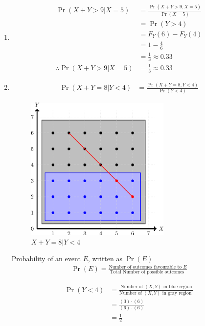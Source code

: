 \documentclass[journal,12pt,twocolumn]{IEEEtran}
\providecommand{\pr}[1]{\ensuremath{\Pr\left(#1\right)}}
\providecommand{\brak}[1]{\ensuremath{\left(#1\right)}}
\theoremstyle{remark}
\begin{document}
\begin{enumerate}[label=(\alph*)]
    \item
    \begin{align}
        \pr{X+Y> 9 | X = 5} &= \frac{\pr{X+Y> 9, X = 5}}{\pr{X = 5}}\\
                          &= \pr{Y > 4}\\
                          &= F_{Y}(6) -F_{Y}(4)\\
                          &= 1 - \frac{4}{6}\\
                          &= \frac{1}{3} \approx 0.33\\
                          \therefore \pr{X+Y> 9 | X = 5} &= \frac{1}{3}\approx 0.33
    \end{align}
\item

\begin{align}
\pr{X+Y = 8 | Y < 4} &= \frac{\pr{X+Y = 8, Y < 4}}{\pr{Y < 4}}
\end{align}

\begin{figure}[h!]
  \centering \includegraphics[width= 7.15cm]{figs/figure}
  \caption{$X+Y = 8 | Y < 4$}
  \label{fig:1}
\end{figure}



Probability of an event $E$, written as $\pr{E}$
\begin{align}
\pr{E}=\frac{\text{Number of outcomes favourable to $E$}}{\text{Total Number of possible outcomes }}
\end{align}

\begin{align}
    \pr{Y < 4} &= \frac{\text{Number of $(X,Y)$ in blue region}}{\text{Number of $(X,Y)$ in gray region }}\\
    &= \frac{\brak{3}\cdot\brak{6}}{\brak{6}\cdot\brak{6}}\\
    &= \frac{1}{2}
\end{align}


\end{enumerate}
\end{document}
